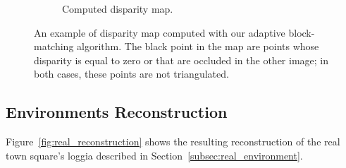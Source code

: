 \begin{figure}[h]
\begin{subfigure}{0.7\linewidth}
		\caption{Computed disparity map.}
	\end{subfigure}
\caption{An example of disparity map computed with our adaptive block-matching
algorithm. The black point in the map are points whose disparity is equal to
zero or that are occluded in the other image; in both cases, these points are
not triangulated.}
\label{fig:llDisparity}
\end{figure}

\subsection{Environments Reconstruction}
Figure~\ref{fig:real_reconstruction} shows the resulting reconstruction of the
real town square's loggia described in Section~\ref{subsec:real_environment}.
%
